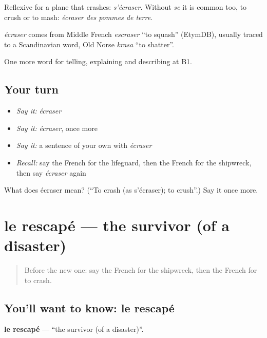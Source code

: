 Reflexive for a plane that crashes: \emph{s'écraser}. Without \emph{se} it is common too, to crush or to mash: \emph{écraser des pommes de terre}.

\begin{cousinweb}
\emph{écraser} comes from Middle French \emph{escraser} \textquotedblleft{}to squash\textquotedblright{} (EtymDB), usually traced to a Scandinavian word, Old Norse \emph{krasa} \textquotedblleft{}to shatter\textquotedblright{}.
\end{cousinweb}

\begin{grammarlens}[title={What you've built}]
One more word for telling, explaining and describing at B1.
\end{grammarlens}

\subsection*{Your turn}
\begin{itemize}
\raggedright
  \item \emph{Say it:} \emph{écraser}
  \item \emph{Say it:} \emph{écraser}, once more
  \item \emph{Say it:} a sentence of your own with \emph{écraser}
  \item \emph{Recall:} say the French for the lifeguard, then the French for the shipwreck, then say \emph{écraser} again
\end{itemize}

\begin{tcolorbox}[breakable,colback=teal!4,colframe=teal!35!black,title={Before you move on}]
What does écraser mean? (\textquotedblleft{}To crash (as s'écraser); to crush\textquotedblright{}.) Say it once more.
\end{tcolorbox}
\section[le rescapé]{le rescapé — the survivor (of a disaster)}

\label{lesson:FR-C305-rescape}



\begin{quote}
Before the new one: say the French for the shipwreck, then the French for to crash.
\end{quote}

\subsection*{You'll want to know: le rescapé}
\textbf{le rescapé} — \textquotedblleft{}the survivor (of a disaster)\textquotedblright{}.

